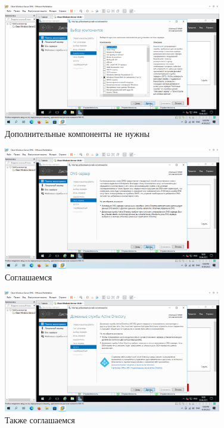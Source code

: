 \documentclass[a4paper]{article}
\begin{document}
  \begin{figure}[H]
    \centering
    \includegraphics[width=0.85\textwidth]{Screenshot_45}
    \caption{Дополнительные компоненты не нужны}
    \label{img:45}
  \end{figure}

  \begin{figure}[H]
    \centering
    \includegraphics[width=0.85\textwidth]{Screenshot_46}
    \caption{Соглашаемся}
    \label{img:46}
  \end{figure}

  \begin{figure}[H]
    \centering
    \includegraphics[width=0.85\textwidth]{Screenshot_47}
    \caption{Также соглашаемся}
    \label{img:47}
  \end{figure}
\end{document}
